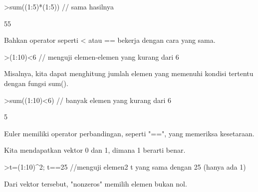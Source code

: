 \documentclass[a4paper,10pt]{article}
\begin{document}
\begin{eulernotebook}
\begin{eulercomment}
\begin{eulercomment}
\begin{eulercomment}
\begin{eulercomment}
\begin{eulercomment}
\begin{eulercomment}
\begin{eulercomment}
\begin{eulercomment}
\begin{eulerprompt}
>sum((1:5)*(1:5)) // sama hasilnya
\end{eulerprompt}
\begin{euleroutput}
  55
\end{euleroutput}
\begin{eulercomment}
Bahkan operator seperti \textless{} atau == bekerja dengan cara yang sama.
\end{eulercomment}
\begin{eulerprompt}
>(1:10)<6 // menguji elemen-elemen yang kurang dari 6
\end{eulerprompt}
\begin{euleroutput}
  [1,  1,  1,  1,  1,  0,  0,  0,  0,  0]
\end{euleroutput}
\begin{eulercomment}
Misalnya, kita dapat menghitung jumlah elemen yang memenuhi kondisi
tertentu dengan fungsi sum().
\end{eulercomment}
\begin{eulerprompt}
>sum((1:10)<6) // banyak elemen yang kurang dari 6
\end{eulerprompt}
\begin{euleroutput}
  5
\end{euleroutput}
\begin{eulercomment}
Euler memiliki operator perbandingan, seperti "==", yang memeriksa
kesetaraan.

Kita mendapatkan vektor 0 dan 1, dimana 1 berarti benar.
\end{eulercomment}
\begin{eulerprompt}
>t=(1:10)^2; t==25 //menguji elemen2 t yang sama dengan 25 (hanya ada 1)
\end{eulerprompt}
\begin{euleroutput}
  [0,  0,  0,  0,  1,  0,  0,  0,  0,  0]
\end{euleroutput}
\begin{eulercomment}
Dari vektor tersebut, "nonzeros" memilih elemen bukan nol.


\end{eulercomment}
\end{eulercomment}
\end{eulercomment}
\end{eulercomment}
\end{eulercomment}
\end{eulercomment}
\end{eulercomment}
\end{eulercomment}
\end{eulercomment}
\end{eulernotebook}
\end{document}
